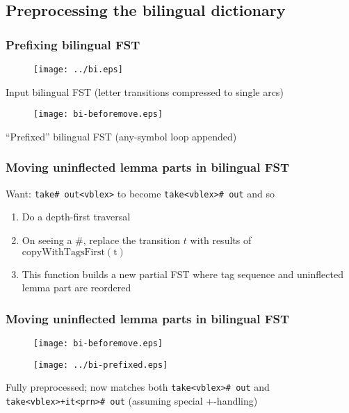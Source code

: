 \documentclass[notes=hide]{beamer}
\newcommand{\ana}[1]{\texttt{#1}}
\newcommand{\fn}[1]{$\mathrm{#1}$}
\begin{document}
\subsection{Preprocessing the bilingual dictionary}
\begin{frame}
  \frametitle{Prefixing bilingual FST}
  \begin{center}
    \begin{figure}[h]
      \texttt{[image: ../bi.eps]}
    \end{figure}
    \scriptsize{Input bilingual FST (letter transitions compressed to single arcs)}
    \begin{figure}[h]
      \texttt{[image: bi-beforemove.eps]}
    \end{figure}
    \scriptsize{``Prefixed'' bilingual FST (any-symbol loop appended)}
  \end{center}
\end{frame}

\begin{frame}
  \frametitle{Moving uninflected lemma parts in bilingual FST}
  Want: \ana{take\# out<vblex>} to become \ana{take<vblex>\# out} and so 
  \begin{enumerate}
  \item Do a depth-first traversal
  \item On seeing a \#, replace the transition $t$ with results of \fn{copyWithTagsFirst(t)}
  \item This function builds a new partial FST where tag
    sequence and uninflected lemma part are reordered
  \end{enumerate}
\end{frame}

\begin{frame}
  \frametitle{Moving uninflected lemma parts in bilingual FST}
  \begin{center}
    \begin{figure}[h]
      \texttt{[image: bi-beforemove.eps]}
    \end{figure}

    \begin{figure}[h]
      \texttt{[image: ../bi-prefixed.eps]}
    \end{figure}
    \scriptsize{Fully preprocessed; now matches both \ana{take<vblex>\# out} and \ana{take<vblex>+it<prn>\# out} (assuming special +-handling) }
  \end{center}

\end{frame}
\end{document}
